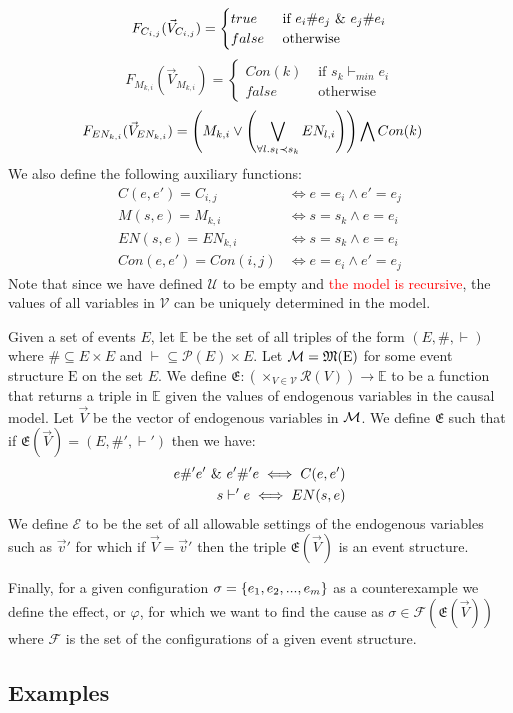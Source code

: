 $$
    F_{C_{i,j}}(\vec V_{C_{i,j}}) = \begin{cases}
        true  & \text{ if } e_i \# e_j \ \& \  e_j \# e_i \\
        false & \text{ otherwise }
    \end{cases}
$$
$$
    F_{M_{k,i}}(\vec V_{M_{k,i}}) = \begin{cases}
        Con(k) & \text{ if } s_k \vdash_{min} e_i \\
        false  & \text{ otherwise }
    \end{cases}
$$
\begin{align*}
    F_{EN_{k,i}}(\vec V_{EN_{k,i}}) & =
    \left(
    M_{k,i} \vee
    \left(
    \bigvee_{\forall l. s_l  \prec s_k}EN_{l,i}
    \right)
    \right)
    \bigwedge
    Con(k)
\end{align*}
We also define the following auxiliary functions:
\begin{align*}
    C(e,e') = C_{i,j}    & \iff e = e_i \wedge e' = e_j \\
    M(s,e)  = M_{k,i}    & \iff s = s_k \wedge e = e_i  \\
    EN(s,e)  = EN_{k,i}  & \iff s = s_k \wedge e = e_i  \\
    Con(e,e') = Con(i,j) & \iff e = e_i \wedge e' = e_j
\end{align*}
Note that since we have defined $\mathcal{U}$ to be empty and
\textcolor{red}{the model is recursive}, the values of all variables in
$\mathcal{V}$ can be uniquely determined in the model.

Given a set of events $E$, let $\mathbb{E}$ be the set of all
triples of the form $(E,\#,\vdash)$ where $\# \subseteq E \times E$ 
and $\vdash \subseteq \mathcal{P}(E) \times E$.
Let $\mathcal{M} = \mathfrak{M}(\mathrm{E})$ for some event structure
$\mathrm{E}$ on the set $E$.
We define $\mathfrak{E}: (\times_{V \in \mathcal{V}}\mathcal{R}(V)) \rightarrow \mathbb{E}$
to be a function that returns a triple in $\mathbb{E}$ given the
values of endogenous variables in the causal model.
Let $\vec V$ be the vector of endogenous variables in $\mathcal{M}$.
We define $\mathfrak{E}$ such that if
$\mathfrak{E}(\vec V) = (E,\#',\vdash')$ then we have:
\begin{align*}
    e \#' e' \ \& \  e' \#' e \iff C(e,e') \\
    s \vdash' e \iff EN(s,e)
\end{align*}
We define $\mathcal{E}$ to be the set of all allowable
settings of the endogenous variables such as $\vec v'$ 
for which if $\vec V = \vec v'$ then the triple 
$\mathfrak{E}(\vec V)$ is an event structure.

Finally, for a given configuration $\sigma = \{e_1,e_2,...,e_m\}$ 
as a counterexample we define the effect, or $\varphi$, for which 
we want to find the cause as 
$\sigma \in \mathcal{F}(\mathfrak{E}(\vec V))$ where $\mathcal{F}$ 
is the set of the configurations of a given event structure.
\pagebreak
\subsection{Examples}
